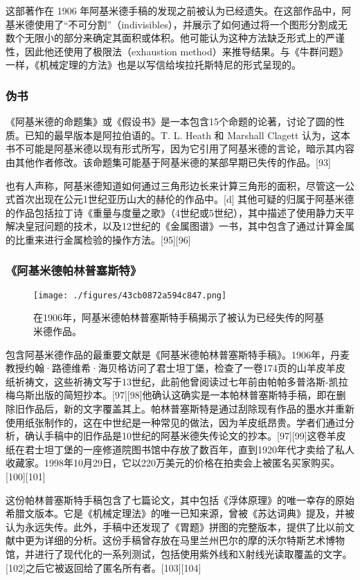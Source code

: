 这部著作在 1906 年阿基米德手稿的发现之前被认为已经遗失。在这部作品中，阿基米德使用了“不可分割”（indivisibles），并展示了如何通过将一个图形分割成无数个无限小的部分来确定其面积或体积。他可能认为这种方法缺乏形式上的严谨性，因此他还使用了极限法（exhaustion method）来推导结果。与《牛群问题》一样，《机械定理的方法》也是以写信给埃拉托斯特尼的形式呈现的。

\subsubsection{伪书}  
《阿基米德的命题集》或《假设书》是一本包含15个命题的论著，讨论了圆的性质。已知的最早版本是阿拉伯语的。T. L. Heath 和 Marshall Clagett 认为，这本书不可能是阿基米德以现有形式所写，因为它引用了阿基米德的言论，暗示其内容由其他作者修改。该命题集可能基于阿基米德的某部早期已失传的作品。[93]

也有人声称，阿基米德知道如何通过三角形边长来计算三角形的面积，尽管这一公式首次出现在公元1世纪亚历山大的赫伦的作品中。[d] 其他可疑的归属于阿基米德的作品包括拉丁诗《重量与度量之歌》（4世纪或5世纪），其中描述了使用静力天平解决皇冠问题的技术，以及12世纪的《金属图谱》一书，其中包含了通过计算金属的比重来进行金属检验的操作方法。[95][96]
\subsubsection{《阿基米德帕林普塞斯特》}
\begin{figure}[ht]
\centering
\texttt{[image: ./figures/43cb0872a594c847.png]}
\caption{在1906年，阿基米德帕林普塞斯特手稿揭示了被认为已经失传的阿基米德作品。} \label{fig_Archim_10}
\end{figure}
包含阿基米德作品的最重要文献是《阿基米德帕林普塞斯特手稿》。1906年，丹麦教授约翰·路德维希·海贝格访问了君士坦丁堡，检查了一卷174页的山羊皮羊皮纸祈祷文，这些祈祷文写于13世纪，此前他曾阅读过七年前由帕帕多普洛斯-凯拉梅乌斯出版的简短抄本。[97][98]他确认这确实是一本帕林普塞斯特手稿，即在删除旧作品后，新的文字覆盖其上。帕林普塞斯特是通过刮除现有作品的墨水并重新使用纸张制作的，这在中世纪是一种常见的做法，因为羊皮纸昂贵。学者们通过分析，确认手稿中的旧作品是10世纪的阿基米德失传论文的抄本。[97][99]这卷羊皮纸在君士坦丁堡的一座修道院图书馆中存放了数百年，直到1920年代才卖给了私人收藏家。1998年10月29日，它以220万美元的价格在拍卖会上被匿名买家购买。[100][101]

这份帕林普塞斯特手稿包含了七篇论文，其中包括《浮体原理》的唯一幸存的原始希腊文版本。它是《机械定理法》的唯一已知来源，曾被《苏达词典》提及，并被认为永远失传。此外，手稿中还发现了《胃题》拼图的完整版本，提供了比以前文献中更为详细的分析。这份手稿曾存放在马里兰州巴尔的摩的沃尔特斯艺术博物馆，并进行了现代化的一系列测试，包括使用紫外线和X射线光读取覆盖的文字。[102]之后它被返回给了匿名所有者。[103][104]

